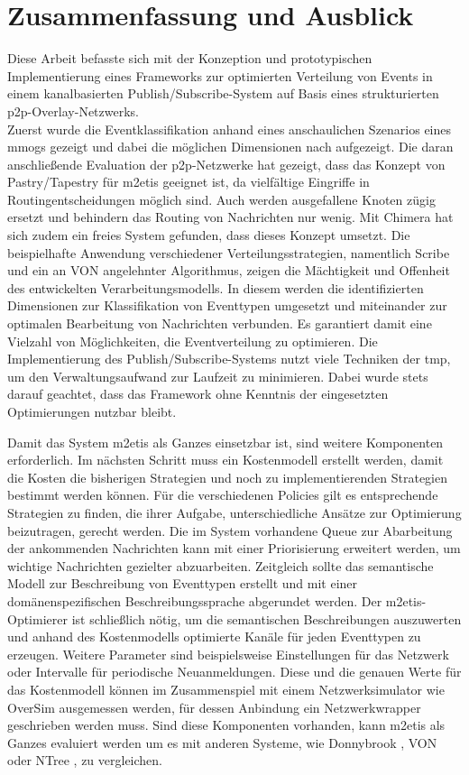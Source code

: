 \chapter{Zusammenfassung und Ausblick} 
\label{chap:zus}
Diese Arbeit befasste sich mit der Konzeption und prototypischen Implementierung eines Frameworks zur optimierten Verteilung von Events in einem kanalbasierten Publish/Subscribe-System auf Basis eines strukturierten p2p-Overlay-Netzwerks.\\
Zuerst wurde die Eventklassifikation anhand eines anschaulichen Szenarios eines \acp{mmog} gezeigt und dabei die möglichen Dimensionen nach \cite{Fischer2010Event} aufgezeigt. Die daran anschließende Evaluation der p2p-Netzwerke hat gezeigt, dass das Konzept von Pastry/Tapestry für \ac{m2etis} geeignet ist, da vielfältige Eingriffe in Routingentscheidungen möglich sind. Auch werden ausgefallene Knoten zügig ersetzt und behindern das Routing von Nachrichten nur wenig. Mit Chimera hat sich zudem ein freies System gefunden, dass dieses Konzept umsetzt. Die beispielhafte Anwendung verschiedener Verteilungsstrategien, namentlich Scribe und ein an VON angelehnter Algorithmus, zeigen die Mächtigkeit und Offenheit des entwickelten Verarbeitungsmodells. In diesem werden die identifizierten Dimensionen zur Klassifikation von Eventtypen umgesetzt und miteinander zur optimalen Bearbeitung von Nachrichten verbunden. Es garantiert damit eine Vielzahl von Möglichkeiten, die Eventverteilung zu optimieren. Die Implementierung des Publish/Subscribe-Systems nutzt viele Techniken der \ac{tmp}, um den Verwaltungsaufwand zur Laufzeit zu minimieren. Dabei wurde stets darauf geachtet, dass das Framework ohne Kenntnis der eingesetzten Optimierungen nutzbar bleibt.

Damit das System \ac{m2etis} als Ganzes einsetzbar ist, sind weitere Komponenten erforderlich. Im nächsten Schritt muss ein Kostenmodell erstellt werden, damit die Kosten die bisherigen Strategien und noch zu implementierenden Strategien bestimmt werden können. Für die verschiedenen Policies gilt es entsprechende Strategien zu finden, die ihrer Aufgabe, unterschiedliche Ansätze zur Optimierung beizutragen, gerecht werden. Die im System vorhandene Queue zur Abarbeitung der ankommenden Nachrichten kann mit einer Priorisierung erweitert werden, um wichtige Nachrichten gezielter abzuarbeiten. Zeitgleich sollte das semantische Modell zur Beschreibung von Eventtypen erstellt und mit einer domänenspezifischen Beschreibungssprache abgerundet werden. Der \ac{m2etis}-Optimierer ist schließlich nötig, um die semantischen Beschreibungen auszuwerten und anhand des Kostenmodells optimierte Kanäle für jeden Eventtypen zu erzeugen. Weitere Parameter sind beispielsweise Einstellungen für das Netzwerk oder Intervalle für periodische Neuanmeldungen. Diese und die genauen Werte für das Kostenmodell können im Zusammenspiel mit einem Netzwerksimulator wie OverSim \cite{Baumgart2007OverSim} ausgemessen werden, für dessen Anbindung ein Netzwerkwrapper geschrieben werden muss. Sind diese Komponenten vorhanden, kann \ac{m2etis} als Ganzes evaluiert werden um es mit anderen Systeme, wie Donnybrook \cite{Bharambe2008Donnybrook}, VON \cite{Hu2006VON} oder NTree \cite{GauthierDickey2005Using}, zu vergleichen.
